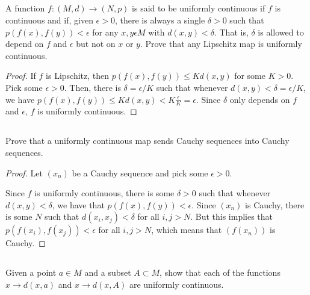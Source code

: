 \subsection{} A function $f: (M, d) \rightarrow (N, p)$ is said to be uniformly continuous if $f$ is continuous and if, given $\epsilon > 0$, there is always a single $\delta > 0$ such that $p(f(x), f(y)) <  \epsilon$ for any $x, y \epsilon M$ with $d(x, y) < \delta$. That is, $\delta$ is allowed to depend on $f$ and $\epsilon$ but not on $x$ or $y$. Prove that any Lipschitz map is uniformly continuous. 

\begin{proof}
If $f$ is Lipschitz, then $p(f(x), f(y)) \leq Kd(x,y)$ for some $K>0$. Pick some $\epsilon > 0$. Then, there is $\delta = \epsilon/K$ such that whenever $d(x,y) < \delta = \epsilon/K$, we have $p(f(x), f(y)) \leq Kd(x,y) < K \frac{\epsilon}{K} = \epsilon$. Since $\delta$ only depends on $f$ and $\epsilon$, $f$ is uniformly continuous.
\end{proof}


\subsection{} Prove that a uniformly continuous map sends Cauchy sequences into Cauchy sequences.

\begin{proof}

Let $(x_n)$ be a Cauchy sequence and pick some $\epsilon>0$.

Since $f$ is uniformly continuous, there is some $\delta>0$ such that whenever $d(x,y) < \delta$, we have that $p(f(x), f(y)) < \epsilon$. Since $(x_n)$ is Cauchy, there is some $N$ such that $d(x_i, x_j) < \delta$ for all $i,j > N$. But this implies that $p(f(x_i), f(x_j)) < \epsilon$ for all $i,j > N$, which means that $(f(x_n))$ is Cauchy.

\end{proof}

\newpage


\subsection{} Given a point $a \in M$ and a subset $A \subset M$, show that each of the functions $x \rightarrow d(x, a)$ and $x \rightarrow d(x, A)$ are uniformly continuous. 


